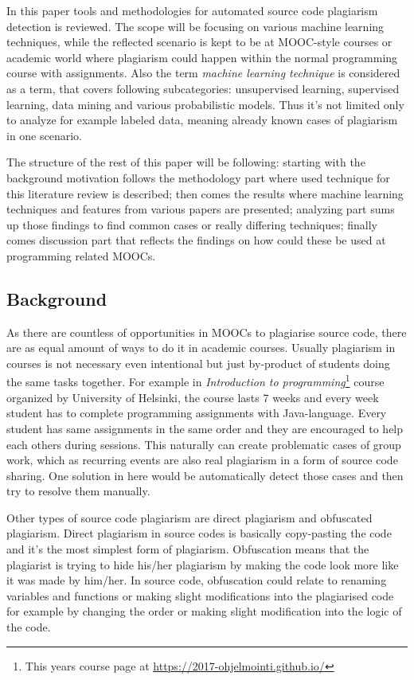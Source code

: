 \documentclass[english]{tktltiki2}
\theoremstyle{definition}
\theoremstyle{remark}
\begin{document}
In this paper tools and methodologies for automated source code plagiarism detection is reviewed. The scope will be focusing on various machine learning techniques, while the reflected scenario is kept to be at MOOC-style courses or academic world where plagiarism could happen within the normal programming course with assignments. Also the term \textit{machine learning technique} is considered as a term, that covers following subcategories: unsupervised learning, supervised learning, data mining and various probabilistic models. Thus it's not limited only to analyze for example labeled data, meaning already known cases of plagiarism in one scenario. 

The structure of the rest of this paper will be following: starting with the background motivation follows the methodology part where used technique for this literature review is described; then comes the results where machine learning techniques and features from various papers are presented; analyzing part sums up those findings to find common cases or really differing techniques; finally comes discussion part that reflects the findings on how could these be used at programming related MOOCs.

\subsection{Background}


As there are countless of opportunities in MOOCs to plagiarise source code, there are as equal amount of ways to do it in academic courses. Usually plagiarism in courses is not necessary even intentional but just by-product of students doing the same tasks together. For example in \textit{Introduction to programming}\footnote{This years course page at \url{https://2017-ohjelmointi.github.io/}} course organized by University of Helsinki, the course lasts 7 weeks and every week student has to complete programming assignments with Java-language. Every student has same assignments in the same order and they are encouraged to help each others during sessions. This naturally can create problematic cases of group work, which as recurring events are also real plagiarism in a form of source code sharing. One solution in here would be automatically detect those cases and then try to resolve them manually.  

Other types of source code plagiarism are direct plagiarism and obfuscated plagiarism. Direct plagiarism in source codes is basically copy-pasting the code and it's the most simplest form of plagiarism. Obfuscation means that the plagiarist is trying to hide his/her plagiarism by making the code look more like it was made by him/her. In source code, obfuscation could relate to renaming variables and functions or making slight modifications into the plagiarised code for example by changing the order or making slight modification into the logic of the code.
\end{document}
